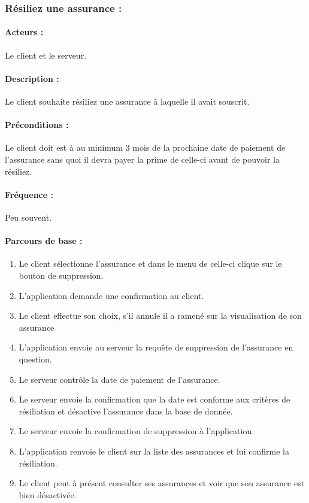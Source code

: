\documentclass[../annexe.tex]{subfiles}
\begin{document}
\subsubsection{Résiliez une assurance :}

\paragraph{Acteurs :}
		Le client et le serveur.
\paragraph{Description :}
		Le client souhaite résiliez une assurance à laquelle il avait souscrit.
\paragraph{Préconditions :}
		Le client doit est à au minimum 3 mois de la prochaine date de paiement de l'assurance sans quoi il devra payer la prime de celle-ci avant de pouvoir la résiliez.
\paragraph{Fréquence :}
		Peu souvent.
\paragraph{Parcours de base :}
		\begin{enumerate}
				\item Le client sélectionne l'assurance et dans le menu de celle-ci clique sur le bouton de suppression.
				\item L'application demande une confirmation au client.
				\item Le client effectue son choix, s'il annule il a ramené sur la visualisation de son assurance
				\item L'application envoie au serveur la requête de suppression de l'assurance en question.
				\item Le serveur contrôle la date de paiement de l'assurance.
				\item Le serveur envoie la confirmation que la date est conforme aux critères de résiliation et désactive l'assurance dans la base de donnée.
				\item Le serveur envoie la confirmation de suppression à l'application.
				\item L'application renvoie le client sur la liste des assurances et lui confirme la résiliation.
				\item Le client peut à présent consulter ses assurances et voir que son assurance est bien désactivée.
		\end{enumerate}
\end{document}
